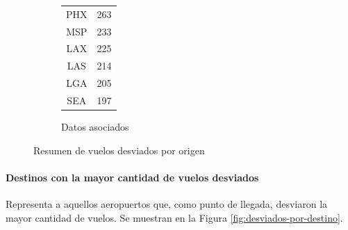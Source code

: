 \documentclass[12pt]{article}
\numberwithin{equation}{section}
\numberwithin{table}{section}
\numberwithin{figure}{section}
\begin{document}
\begin{figure}
\begin{subfigure}[b]{0.3\textwidth}
\begin{tabular}{@{}cc@{}}
PHX                 & 263               \\
MSP                 & 233               \\
LAX                 & 225               \\
LAS                 & 214               \\
LGA                 & 205               \\
SEA                 & 197               \\ \bottomrule
\end{tabular}
                \caption{Datos asociados}
        \end{subfigure}
        \caption{Resumen de vuelos desviados por origen}
        \label{fig:desviados-por-origen}
\end{figure}

\paragraph{Destinos con la mayor cantidad de vuelos desviados}
Representa a aquellos aeropuertos que, como punto de llegada, desviaron la mayor cantidad de vuelos. Se muestran en la Figura \ref{fig:desviados-por-destino}.
\end{document}
